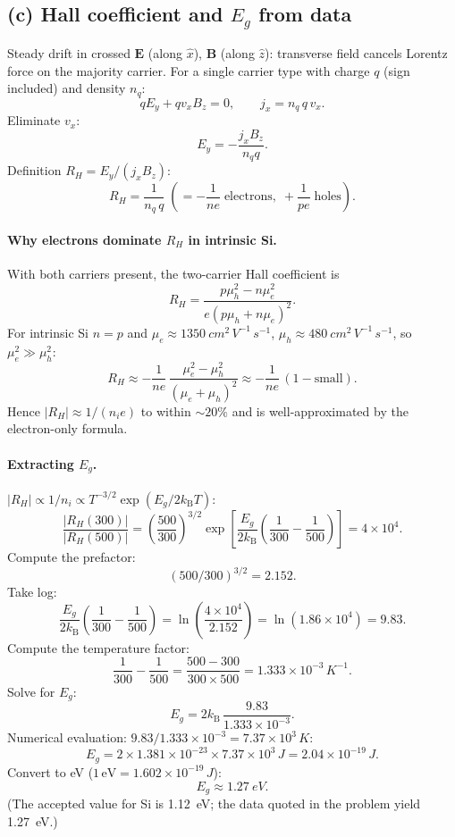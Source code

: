 \documentclass[11pt]{article}
\newcommand{\kB}{k_{\mathrm{B}}}
\begin{document}
\subsection*{(c) Hall coefficient and $E_{g}$ from data}

Steady drift in crossed $\mathbf E$ (along $\hat x$), $\mathbf B$ (along $\hat z$): transverse field cancels Lorentz force on the majority carrier. For a single carrier type with charge $q$ (sign included) and density $n_{q}$:
\[
qE_{y} + q v_{x} B_{z} = 0,\qquad j_{x} = n_{q}\,q\,v_{x}.
\]
Eliminate $v_{x}$:
\[
E_{y} = -\frac{j_{x} B_{z}}{n_{q} q}.
\]
Definition $R_{H} = E_{y}/(j_{x} B_{z})$:
\[
\boxed{\;R_{H} = \frac{1}{n_{q}\,q}\;\left(=-\frac{1}{n e}\;\text{electrons},\; +\frac{1}{p e}\;\text{holes}\right).\;}
\]

\paragraph{Why electrons dominate $R_{H}$ in intrinsic Si.} With both carriers present, the two-carrier Hall coefficient is
\[
R_{H} = \frac{p\mu_{h}^{2}-n\mu_{e}^{2}}{e(p\mu_{h}+n\mu_{e})^{2}}.
\]
For intrinsic Si $n=p$ and $\mu_{e}\approx\SI{1350}{cm^{2}\,V^{-1}\,s^{-1}}$, $\mu_{h}\approx\SI{480}{cm^{2}\,V^{-1}\,s^{-1}}$, so $\mu_{e}^{2}\gg\mu_{h}^{2}$:
\[
R_{H}\approx -\frac{1}{n e}\,\frac{\mu_{e}^{2}-\mu_{h}^{2}}{(\mu_{e}+\mu_{h})^{2}} \approx -\frac{1}{n e}\,(1-\text{small}).
\]
Hence $|R_{H}|\approx 1/(n_{i} e)$ to within $\sim 20\%$ and is well-approximated by the electron-only formula.

\paragraph{Extracting $E_{g}$.} $|R_{H}|\propto 1/n_{i}\propto T^{-3/2}\exp(E_{g}/2\kB T)$:
\[
\frac{|R_{H}(300)|}{|R_{H}(500)|} = \!\left(\frac{500}{300}\right)^{\!3/2}\!\exp\!\left[\frac{E_{g}}{2\kB}\!\left(\frac{1}{300}-\frac{1}{500}\right)\right] = 4\times 10^{4}.
\]
Compute the prefactor:
\[
(500/300)^{3/2} = 2.152.
\]
Take log:
\[
\frac{E_{g}}{2\kB}\!\left(\frac{1}{300}-\frac{1}{500}\right) = \ln\!\left(\frac{4\times 10^{4}}{2.152}\right) = \ln(1.86\times 10^{4}) = 9.83.
\]
Compute the temperature factor:
\[
\frac{1}{300}-\frac{1}{500} = \frac{500-300}{300\times 500} = 1.333\times 10^{-3}\,\si{K^{-1}}.
\]
Solve for $E_{g}$:
\[
E_{g} = 2\kB\,\frac{9.83}{1.333\times 10^{-3}}.
\]
Numerical evaluation: $9.83/1.333\times 10^{-3}=7.37\times 10^{3}\,\si{K}$:
\[
E_{g} = 2\times 1.381\times 10^{-23}\times 7.37\times 10^{3}\,\si{J} = 2.04\times 10^{-19}\,\si{J}.
\]
Convert to eV ($1\,\mathrm{eV}=1.602\times 10^{-19}\,\si{J}$):
\[
\boxed{\;E_{g}\approx \SI{1.27}{eV}.\;}
\]
(The accepted value for Si is \SI{1.12}{eV}; the data quoted in the problem yield \SI{1.27}{eV}.)
\end{document}
